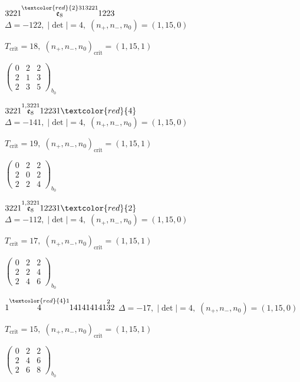 \documentclass[10pt]{article}
\begin{document}
$3221\overset{\textcolor{red}{2}313221}{\mathfrak{e}_8}1223$ \quad $\Delta=-122,\; |\det|=4,\; (n_+,n_-,n_0)=(1,15,0)$

\hspace{1em}$T_{\text{crit}}=18,\; (n_+,n_-,n_0)_{\text{crit}}=(1,15,1)$

\hspace{2em}$\left(\begin{smallmatrix}0 & 2 & 2 \\ 2 & 1 & 3 \\ 2 & 3 & 5\end{smallmatrix}\right)_{\!b_0}$

\smallskip

$3221\overset{1,3221}{\mathfrak{e}_8}12231\textcolor{red}{4}$ \quad $\Delta=-141,\; |\det|=4,\; (n_+,n_-,n_0)=(1,15,0)$

\hspace{1em}$T_{\text{crit}}=19,\; (n_+,n_-,n_0)_{\text{crit}}=(1,15,1)$

\hspace{2em}$\left(\begin{smallmatrix}0 & 2 & 2 \\ 2 & 0 & 2 \\ 2 & 2 & 4\end{smallmatrix}\right)_{\!b_0}$

$3221\overset{1,3221}{\mathfrak{e}_8}12231\textcolor{red}{2}$ \quad $\Delta=-112,\; |\det|=4,\; (n_+,n_-,n_0)=(1,15,0)$

\hspace{1em}$T_{\text{crit}}=17,\; (n_+,n_-,n_0)_{\text{crit}}=(1,15,1)$

\hspace{2em}$\left(\begin{smallmatrix}0 & 2 & 2 \\ 2 & 2 & 4 \\ 2 & 4 & 6\end{smallmatrix}\right)_{\!b_0}$

\smallskip

$1\overset{\textcolor{red}{4}1}{4}141414141\overset{2}{3}2$ \quad $\Delta=-17,\; |\det|=4,\; (n_+,n_-,n_0)=(1,15,0)$

\hspace{1em}$T_{\text{crit}}=15,\; (n_+,n_-,n_0)_{\text{crit}}=(1,15,1)$

\hspace{2em}$\left(\begin{smallmatrix}0 & 2 & 2 \\ 2 & 4 & 6 \\ 2 & 6 & 8\end{smallmatrix}\right)_{\!b_0}$
\end{document}
